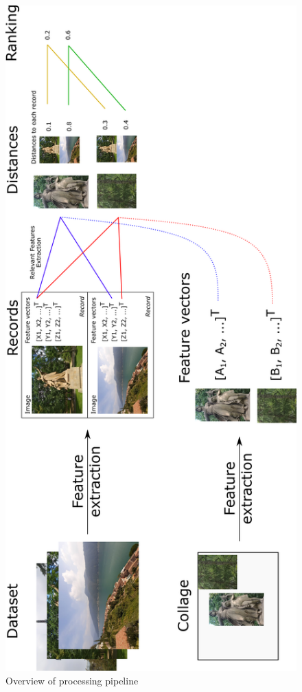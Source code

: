 \begin{figure}[p!]
    \centering
    \includegraphics[scale=0.9]{img/features_pipeline_rotated.png}
    \caption{Overview of processing pipeline}
    \label{fig:processing_pipeline}
\end{figure}


